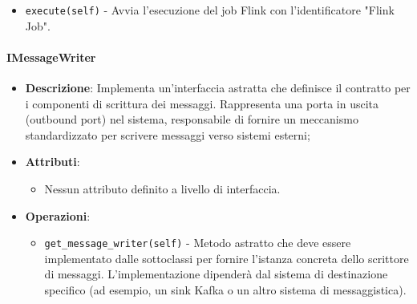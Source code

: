 \documentclass[10pt]{article}
\begin{document}
\begin{itemize}
\begin{itemize}
        \item \texttt{execute(self)} - Avvia l'esecuzione del job Flink con l'identificatore "Flink Job".
    \end{itemize}
    \end{itemize}

    \paragraph{IMessageWriter}
    \begin{itemize} 
    \item \textbf{Descrizione}: Implementa un'interfaccia astratta che definisce il contratto per i componenti di scrittura dei messaggi. Rappresenta una porta in uscita (outbound port) nel sistema, responsabile di fornire un meccanismo standardizzato per scrivere messaggi verso sistemi esterni;
    \item \textbf{Attributi}:
    \begin{itemize}
        \item Nessun attributo definito a livello di interfaccia.
    \end{itemize}
    
    \item \textbf{Operazioni}:
    \begin{itemize}
        \item \texttt{get\_message\_writer(self)} - Metodo astratto che deve essere implementato dalle sottoclassi per fornire l'istanza concreta dello scrittore di messaggi. L'implementazione dipenderà dal sistema di destinazione specifico (ad esempio, un sink Kafka o un altro sistema di messaggistica).
    \end{itemize}
    \end{itemize}
\end{document}
